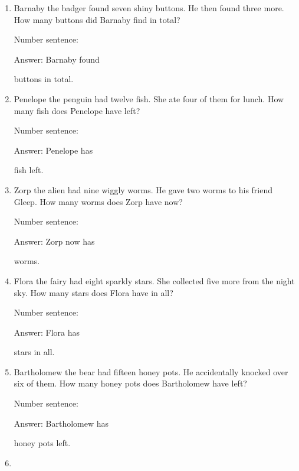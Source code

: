 \documentclass{tufte-book}
\begin{document}
\begin{enumerate}

\item
  Barnaby the badger found seven shiny buttons. He then found three
  more. How many buttons did Barnaby find in total?\medskip\par
  Number sentence:
  \dotfill\medskip\par
  Answer: Barnaby found
  \dotfill\medskip\par\mbox{}\dotfill\medskip\par\mbox{}\dotfill\bigskip
  buttons in total.
\item
  Penelope the penguin had twelve fish. She ate four of them for lunch.
  How many fish does Penelope have left?\medskip\par
  Number sentence:
  \dotfill\medskip\par
  Answer: Penelope has
  \dotfill\medskip\par\mbox{}\dotfill\medskip\par\mbox{}\dotfill\bigskip
  fish left.
\item
  Zorp the alien had nine wiggly worms. He gave two worms to his friend
  Gleep. How many worms does Zorp have now?\medskip\par
  Number sentence:
  \dotfill\medskip\par
  Answer: Zorp now has
  \dotfill\medskip\par\mbox{}\dotfill\medskip\par\mbox{}\dotfill\bigskip
  worms.
\item
  Flora the fairy had eight sparkly stars. She collected five more from
  the night sky. How many stars does Flora have in all?\medskip\par
  Number sentence:
  \dotfill\medskip\par
  Answer: Flora has
  \dotfill\medskip\par\mbox{}\dotfill\medskip\par\mbox{}\dotfill\bigskip
  stars in all.
\item
  Bartholomew the bear had fifteen honey pots. He accidentally knocked
  over six of them. How many honey pots does Bartholomew have left?\medskip\par
  Number sentence:
  \dotfill\medskip\par
  Answer: Bartholomew has
  \dotfill\medskip\par\mbox{}\dotfill\medskip\par\mbox{}\dotfill\bigskip
  honey pots left.
\item

\end{enumerate}
\end{document}
